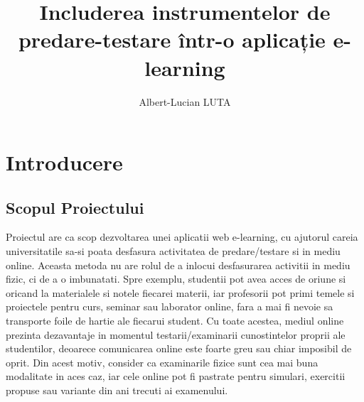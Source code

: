 \documentclass[12pt, a4paper, oneside, romanian]{teza-upb}
\begin{document}
\author{Albert-Lucian LUTA}

\title{Includerea instrumentelor de predare-testare într-o aplicație e-learning}




\beforepreface
\listoffigures
\listoftables
{}
\afterpreface 

\chapter*{Introducere}

\section{Scopul Proiectului}

Proiectul are ca scop dezvoltarea unei aplicatii web e-learning, cu ajutorul careia universitatile sa-si poata desfasura activitatea de predare/testare si in mediu online. Aceasta metoda nu are rolul de a inlocui desfasurarea activitii in mediu fizic, ci de a o imbunatati. Spre exemplu, studentii pot avea acces de oriune si oricand la materialele si notele fiecarei materii, iar profesorii pot primi temele si proiectele pentru curs, seminar sau laborator online, fara a  mai fi nevoie sa transporte foile de hartie ale fiecarui student. Cu toate acestea, mediul online prezinta dezavantaje in momentul testarii/examinarii cunostintelor proprii ale studentilor, deoarece comunicarea online este foarte greu sau chiar imposibil de oprit. Din acest motiv, consider ca examinarile fizice sunt cea mai buna modalitate in aces caz, iar cele online pot fi pastrate pentru simulari, exercitii propuse sau variante din ani trecuti ai examenului.
\end{document}
